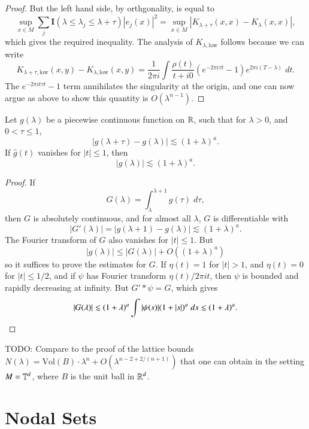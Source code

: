 \begin{proof}
    But the left hand side, by orthgonality, is equal to
    \[ \sup_{x \in M} \sum_j \mathbf{I}(\lambda \leq \lambda_j \leq \lambda + \tau) |e_j(x)|^2 = \sup_{x \in M} |K_{\lambda + \tau}(x,x) - K_{\lambda}(x,x)|, \]
    which gives the required inequality. The analysis of $K_{\lambda, \text{low}}$ follows because we can write
    \[ K_{\lambda + \tau, \text{low}}(x,y) - K_{\lambda, \text{low}}(x,y) = \frac{1}{2 \pi i} \int \frac{\rho(t)}{t + i0} (e^{-2 \pi i \tau t} - 1) e^{2 \pi i (T - \lambda)}\; dt. \]
    The $e^{-2 \pi i t \tau t} - 1$ term annihilates the singularity at the origin, and one can now argue as above to show this quantity is $O(\lambda^{n-1})$.
\end{proof}

\begin{lemma}
    Let $g(\lambda)$ be a piecewise continuous function on $\operatorname{\mathbb{R}}$, such that for $\lambda > 0$, and $0 < \tau \leq 1$,
    \[ |g(\lambda + \tau) - g(\lambda)| \lesssim (1 + \lambda)^a. \]
    If $\widehat{g}(t)$ vanishes for $|t| \leq 1$, then
    \[ |g(\lambda)| \lesssim (1 + \lambda)^a. \]
\end{lemma}
\begin{proof}
    If
    \[ G(\lambda) = \int_\lambda^{\lambda + 1} g(\tau)\; d\tau, \]
    then $G$ is absolutely continuous, and for almost all $\lambda$, $G$ is differentiable with
    \[ |G'(\lambda)| = |g(\lambda + 1) - g(\lambda)| \lesssim (1 + \lambda)^a. \]
    The Fourier transform of $G$ also vanishes for $|t| \leq 1$. But
    \[ |g(\lambda)| \leq |G(\lambda)| + O((1 + \lambda)^a) \]
    so it suffices to prove the estimates for $G$. If $\eta(t) = 1$ for $|t| > 1$, and $\eta(t) = 0$ for $|t| \leq 1/2$, and if $\psi$ has Fourier transform $\eta(t) / 2 \pi i t$, then $\psi$ is bounded and rapidly decreasing at infinity. But $G' * \psi = G$, which gives
    \[ |G(\lambda)| \lesssim (1 + \lambda)^a \int |\psi(s)| (1 + |s|)^a\; ds \lesssim (1 + \lambda)^a. \qedhere \]
\end{proof}

TODO: Compare to the proof of the lattice bounds $N(\lambda) = \text{Vol}(B) \cdot \lambda^n + O( \lambda^{n-2 + 2/(n+1)} )$ that one can obtain in the setting $M = \operatorname{\mathbb{T}}^d$, where $B$ is the unit ball in $\operatorname{\mathbb{R}}^d$.






\chapter{Nodal Sets}

